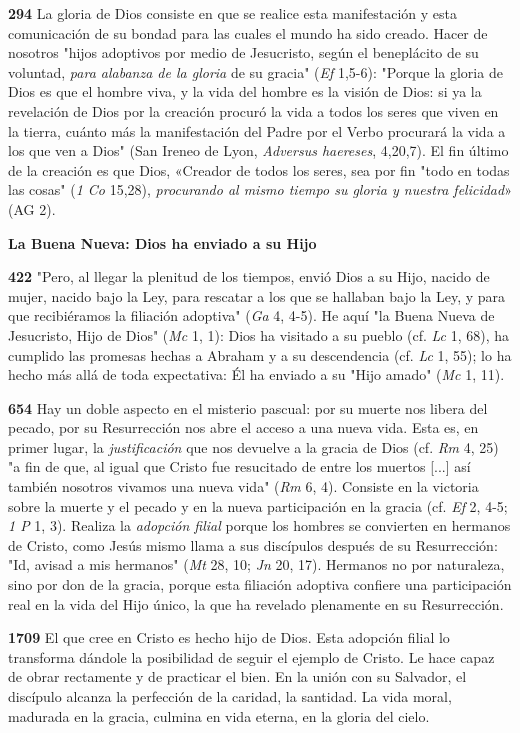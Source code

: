 \documentclass[]{article}
\begin{document}
\textbf{294} La gloria de Dios consiste en que se realice esta
manifestación y esta comunicación de su bondad para las cuales el mundo
ha sido creado. Hacer de nosotros "hijos adoptivos por medio de
Jesucristo, según el beneplácito de su voluntad, \emph{para alabanza de
la gloria} de su gracia" (\emph{Ef} 1,5-6): "Porque la gloria de Dios es
que el hombre viva, y la vida del hombre es la visión de Dios: si ya la
revelación de Dios por la creación procuró la vida a todos los seres que
viven en la tierra, cuánto más la manifestación del Padre por el Verbo
procurará la vida a los que ven a Dios" (San Ireneo de Lyon,
\emph{Adversus haereses}, 4,20,7). El fin último de la creación es que
Dios, «Creador de todos los seres, sea por fin "todo en todas las cosas"
(\emph{1 Co} 15,28), \emph{procurando al mismo tiempo su gloria y
nuestra felicidad}» (AG 2).

\textbf{La Buena Nueva: Dios ha enviado a su Hijo}

\textbf{422} "Pero, al llegar la plenitud de los tiempos, envió Dios a
su Hijo, nacido de mujer, nacido bajo la Ley, para rescatar a los que se
hallaban bajo la Ley, y para que recibiéramos la filiación adoptiva"
(\emph{Ga} 4, 4-5). He aquí "la Buena Nueva de Jesucristo, Hijo de Dios"
(\emph{Mc} 1, 1): Dios ha visitado a su pueblo (cf. \emph{Lc} 1, 68), ha
cumplido las promesas hechas a Abraham y a su descendencia (cf.
\emph{Lc} 1, 55); lo ha hecho más allá de toda expectativa: Él ha
enviado a su "Hijo amado" (\emph{Mc} 1, 11).

\textbf{654} Hay un doble aspecto en el misterio pascual: por su muerte
nos libera del pecado, por su Resurrección nos abre el acceso a una
nueva vida. Esta es, en primer lugar, la \emph{justificación} que nos
devuelve a la gracia de Dios (cf. \emph{Rm} 4, 25) "a fin de que, al
igual que Cristo fue resucitado de entre los muertos {[}...{]} así
también nosotros vivamos una nueva vida" (\emph{Rm} 6, 4). Consiste en
la victoria sobre la muerte y el pecado y en la nueva participación en
la gracia (cf. \emph{Ef} 2, 4-5; \emph{1 P} 1, 3). Realiza la
\emph{adopción filial} porque los hombres se convierten en hermanos de
Cristo, como Jesús mismo llama a sus discípulos después de su
Resurrección: "Id, avisad a mis hermanos" (\emph{Mt} 28, 10; \emph{Jn}
20, 17). Hermanos no por naturaleza, sino por don de la gracia, porque
esta filiación adoptiva confiere una participación real en la vida del
Hijo único, la que ha revelado plenamente en su Resurrección.

\textbf{1709} El que cree en Cristo es hecho hijo de Dios. Esta adopción
filial lo transforma dándole la posibilidad de seguir el ejemplo de
Cristo. Le hace capaz de obrar rectamente y de practicar el bien. En la
unión con su Salvador, el discípulo alcanza la perfección de la caridad,
la santidad. La vida moral, madurada en la gracia, culmina en vida
eterna, en la gloria del cielo.
\end{document}
